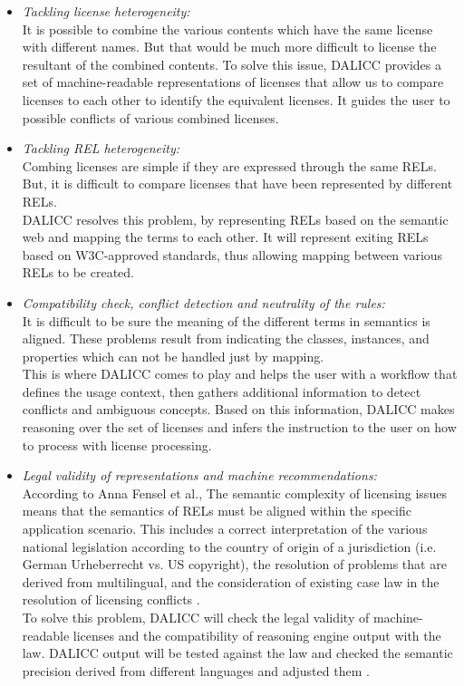\begin{itemize}
	\item \textit{Tackling license heterogeneity:} \\
	It is possible to combine the various contents which have the same license with different names. But that would be much more difficult to license the resultant of the combined contents. To solve this issue, DALICC provides a set of machine-readable representations of licenses that allow us to compare licenses to each other to identify the equivalent licenses. It guides the user to possible conflicts of various combined licenses.
	\item \textit{Tackling REL heterogeneity:} \\
	Combing licenses are simple if they are expressed through the same RELs. But, it is difficult to compare licenses that have been represented by different RELs.\\
	DALICC resolves this problem, by representing RELs based on the semantic web and mapping the terms to each other. It will represent exiting RELs based on W3C-approved standards, thus allowing mapping between various RELs to be created.
	\item \textit{Compatibility check, conflict detection and neutrality of the rules:} \\
	It is difficult to be sure the meaning of the different terms in semantics is aligned. These problems result from indicating the classes, instances, and properties which can not be handled just by mapping.\\
	This is where DALICC comes to play and helps the user with a workflow that defines the usage context, then gathers additional information to detect conflicts and ambiguous concepts. Based on this information, DALICC makes reasoning over the set of licenses and infers the instruction to the user on how to process with license processing.\\
	\item \textit{Legal validity of representations and machine recommendations:} \\
	According to Anna Fensel et al.\cite{Anna}, The semantic complexity of licensing issues means that the semantics of RELs must be aligned within the specific application scenario. This includes a correct interpretation of the various national legislation according to the country of origin of a jurisdiction (i.e. German Urheberrecht vs. US copyright), the resolution of problems that are derived from multilingual, and the consideration of existing case law in the resolution of licensing conflicts \cite{Anna}.\\
	To solve this problem, DALICC will check the legal validity of machine-readable licenses and the compatibility of reasoning engine output with the law. DALICC output will be tested against the law and checked the semantic precision derived from different languages and adjusted them \cite{Anna}.
	
\end{itemize}
